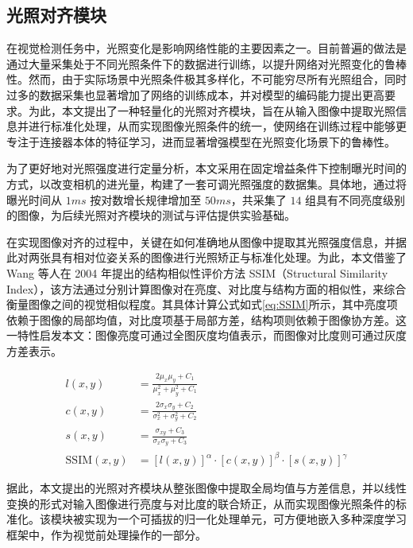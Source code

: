 \documentclass{Diploma}
\begin{document}
\subsection{光照对齐模块}
在视觉检测任务中，光照变化是影响网络性能的主要因素之一。目前普遍的做法是通过大量采集处于不同光照条件下的数据进行训练，以提升网络对光照变化的鲁棒性。然而，由于实际场景中光照条件极其多样化，不可能穷尽所有光照组合，同时过多的数据采集也显著增加了网络的训练成本，并对模型的编码能力提出更高要求。为此，本文提出了一种轻量化的光照对齐模块，旨在从输入图像中提取光照信息并进行标准化处理，从而实现图像光照条件的统一，使网络在训练过程中能够更专注于连接器本体的特征学习，进而显著增强模型在光照变化场景下的鲁棒性。

为了更好地对光照强度进行定量分析，本文采用在固定增益条件下控制曝光时间的方式，以改变相机的进光量，构建了一套可调光照强度的数据集。具体地，通过将曝光时间从 $1ms$ 按对数增长规律增加至 $50ms$，共采集了 $14$ 组具有不同亮度级别的图像，为后续光照对齐模块的测试与评估提供实验基础。

在实现图像对齐的过程中，关键在如何准确地从图像中提取其光照强度信息，并据此对两张具有相对位姿关系的图像进行光照矫正与标准化处理。为此，本文借鉴了 Wang 等人在 2004 年提出的结构相似性评价方法 SSIM（Structural Similarity Index）\cite{wang2004image}，该方法通过分别计算图像对在亮度、对比度与结构方面的相似性，来综合衡量图像之间的视觉相似程度。其具体计算公式如式\eqref{eq:SSIM}所示，其中亮度项依赖于图像的局部均值，对比度项基于局部方差，结构项则依赖于图像协方差。这一特性启发本文：图像亮度可通过全图灰度均值表示，而图像对比度则可通过灰度方差表示。

\begin{equation} \label{eq:SSIM}
\begin{aligned}
l(x, y) &= \frac{2\mu_x \mu_y + C_1}{\mu_x^2 + \mu_y^2 + C_1} \\
c(x, y) &= \frac{2\sigma_x \sigma_y + C_2}{\sigma_x^2 + \sigma_y^2 + C_2} \\
s(x, y) &= \frac{\sigma_{xy} + C_3}{\sigma_x \sigma_y + C_3} \\
\text{SSIM}(x, y) &= [l(x, y)]^\alpha \cdot [c(x, y)]^\beta \cdot [s(x, y)]^\gamma
\end{aligned}
\end{equation}

据此，本文提出的光照对齐模块从整张图像中提取全局均值与方差信息，并以线性变换的形式对输入图像进行亮度与对比度的联合矫正，从而实现图像光照条件的标准化。该模块被实现为一个可插拔的归一化处理单元，可方便地嵌入多种深度学习框架中，作为视觉前处理操作的一部分。
\end{document}
